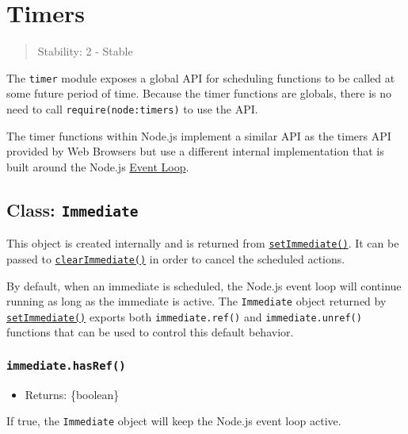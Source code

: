 \section{Timers}\label{timers}

\begin{quote}
Stability: 2 - Stable
\end{quote}

The \texttt{timer} module exposes a global API for scheduling functions
to be called at some future period of time. Because the timer functions
are globals, there is no need to call
\texttt{require(\textquotesingle{}node:timers\textquotesingle{})} to use
the API.

The timer functions within Node.js implement a similar API as the timers
API provided by Web Browsers but use a different internal implementation
that is built around the Node.js
\href{https://nodejs.org/en/docs/guides/event-loop-timers-and-nexttick/\#setimmediate-vs-settimeout}{Event
Loop}.

\subsection{\texorpdfstring{Class:
\texttt{Immediate}}{Class: Immediate}}\label{class-immediate}

This object is created internally and is returned from
\hyperref[setimmediatecallback-args]{\texttt{setImmediate()}}. It can be
passed to \hyperref[clearimmediateimmediate]{\texttt{clearImmediate()}}
in order to cancel the scheduled actions.

By default, when an immediate is scheduled, the Node.js event loop will
continue running as long as the immediate is active. The
\texttt{Immediate} object returned by
\hyperref[setimmediatecallback-args]{\texttt{setImmediate()}} exports
both \texttt{immediate.ref()} and \texttt{immediate.unref()} functions
that can be used to control this default behavior.

\subsubsection{\texorpdfstring{\texttt{immediate.hasRef()}}{immediate.hasRef()}}\label{immediate.hasref}

\begin{itemize}
\tightlist
\item
  Returns: \{boolean\}
\end{itemize}

If true, the \texttt{Immediate} object will keep the Node.js event loop
active.

